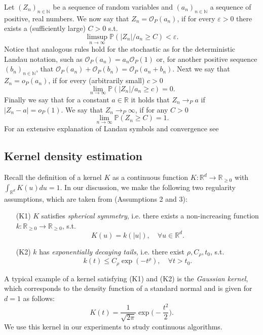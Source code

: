 \documentclass[conference]{IEEEtran}
\begin{document}
Let $(Z_n)_{n \in \mathbb{N}}$ be a sequence of random variables and $(a_n)_{n \in \mathbb{N}}$ a sequence of positive, real numbers. We now say that $Z_n = \mathcal{O}_P(a_n)$, if for every $\varepsilon>0$ there exists a (sufficiently large) $C>0$ s.t.
$$
  \limsup_{n \to \infty} \mathbb{P}(|Z_n|/a_n \ge C)<\varepsilon.
$$
Notice that analogous rules hold for the stochastic as for the deterministic Landau notation, such as $\mathcal{O}_P(a_n) = a_n\mathcal{O}_P(1)$ or, for another positive sequence  $(b_n)_{n \in \mathbb{N}}$, that $\mathcal{O}_P(a_n)+\mathcal{O}_P(b_n) = \mathcal{O}_P(a_n+b_n)$. 
Next we say that $Z_n = o_P(a_n)$, if for every (arbitrarily small) $c>0$ 
$$
  \lim_{n \to \infty} \mathbb{P}(|Z_n|/a_n \ge c)=0.
$$
Finally we say that for a constant $a \in \mathbb{R}$ it holds that $Z_n \to_P a$ if $|Z_n-a|=o_P(1)$. We say that $Z_n \to_P \infty$, if for any $C>0$ 
$$
  \lim_{n \to \infty} \mathbb{P}(Z_n \ge C)=1.
$$
For an extensive explanation of Landau symbols and convergence see \cite{bishop}


\subsection{Kernel density estimation} \label{Appendix_KDE}

Recall the definition of a kernel $K$ as a continuous function $K: \mathbb{R}^d \to \mathbb{R}_{\ge 0}$ with $\int_{\mathbb{R}^d} K(u) du =1$. In our discussion, we make the following two regularity assumptions, which are taken from \cite{jiang2017} (Assumptions 2 and 3):

\begin{itemize}
    \item[(K1)] $K$ satisfies \textit{spherical symmetry}, i.e. there exists a non-increasing function $k: \mathbb{R}_{\ge 0} \to \mathbb{R}_{\ge 0}$, s.t.
    $$
    K(u) = k(|u|), \quad \forall u \in \mathbb{R}^d.
    $$
    \item[(K2)] $k$ has \textit{exponentially decaying tails}, i.e. there exist $\rho, C_\rho, t_0$, s.t. 
    $$
    k(t) \le C_\rho \exp (-t^\rho), \quad \forall t >t_0.
    $$
\end{itemize}

A typical example of a kernel satisfying (K1) and (K2) is the \textit{Gaussian kernel}, which corresponds to the density function of a standard normal and is given for $d=1$ as follows:
$$
    K(t) = \frac{1}{\sqrt{2 \pi}}\exp\Big( -\frac{t^2}{2}\Big).
$$
We use this kernel in our experiments to study continuous algorithms.
\end{document}
